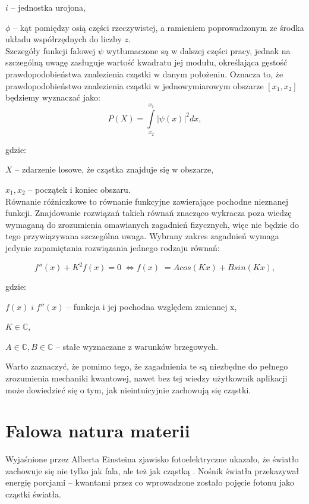 \documentclass{SGGW-thesis}
\begin{document}
	$i$ -- jednostka urojona,
	
	$\phi$ -- kąt pomiędzy osią części rzeczywistej, a ramieniem poprowadzonym ze środka układu współrzędnych do liczby $z$.\\
	
	Szczegóły funkcji falowej $\psi$ wytłumaczone są w dalszej części pracy, jednak na szczególną uwagę zasługuje wartość kwadratu jej modułu, określająca gęstość prawdopodobieństwa znalezienia cząstki w danym położeniu. Oznacza to, że prawdopodobieństwo znalezienia cząstki w jednowymiarowym obszarze $[x_1, x_2]$ będziemy wyznaczać jako:
	\begin{equation}
	P(X) = \int\limits_{x_2}^{x_1} |\psi(x)|^2dx,
	\end{equation}
	
	gdzie:
	
	$X$ -- zdarzenie losowe, że cząstka znajduje się w obszarze,
	
	$x_1, x_2$ -- początek i koniec obszaru.\\ 	
	
	Równanie różniczkowe to równanie funkcyjne zawierające pochodne nieznanej funkcji. Znajdowanie rozwiązań takich równań znacząco wykracza poza wiedzę wymaganą do zrozumienia omawianych zagadnień fizycznych, więc nie będzie do tego przywiązywana szczególna uwaga. Wybrany zakres zagadnień wymaga jedynie zapamiętania rozwiązania jednego rodzaju równań:
	
	\begin{equation}
	f''(x)+K^2f(x)=0 \;\Longleftrightarrow f(x)\; = Acos(Kx) + Bsin(Kx),
	\end{equation}

	gdzie:
	
	$f(x) \; i \; f''(x)$ -- funkcja i jej pochodna względem zmiennej x,

	$K \in \mathbb{C}$,
		
	$A \in \mathbb{C}, B \in \mathbb{C}$ -- stałe wyznaczane z warunków brzegowych.
	
	

	Warto zaznaczyć, że pomimo tego, że zagadnienia te są niezbędne do pełnego zrozumienia mechaniki kwantowej, nawet bez tej wiedzy użytkownik aplikacji może dowiedzieć się o tym, jak nieintuicyjnie zachowują się cząstki.
	\section{Falowa natura materii}
	Wyjaśnione przez Alberta Einsteina zjawisko fotoelektryczne ukazało, że światło zachowuje się nie tylko jak fala, ale też jak cząstką \cite{foto-ele}. Nośnik światła przekazywał energię porcjami -- kwantami przez co wprowadzone zostało pojęcie fotonu jako cząstki światła.
	
\end{document}
